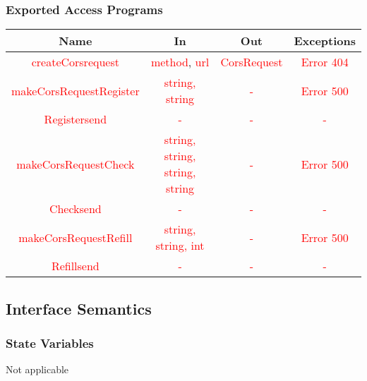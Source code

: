\documentclass[12,english]{article}
\begin{document}
			\subsubsection{Exported Access Programs}
				\begin{tabular}[pos]{|c|c|c|c|}
					
					\hline
					\textbf{Name} & \textbf{In} & \textbf{Out} & \textbf{Exceptions} \\ \hline
					
					\textcolor{red}{createCorsrequest} & \textcolor{red}{method}, \textcolor{red}{url} & \textcolor{red}{CorsRequest} & \textcolor{red}{Error 404} \\ \hline
					\textcolor{red}{makeCorsRequestRegister} & \textcolor{red}{string, string} & \textcolor{red}{-} &  \textcolor{red}{Error 500} \\ \hline
					\textcolor{red}{Registersend} & \textcolor{red}{-} & \textcolor{red}{-} &  \textcolor{red}{-} \\ \hline
					\textcolor{red}{makeCorsRequestCheck} & \textcolor{red}{string, string, string, string} & \textcolor{red}{-} &  \textcolor{red}{Error 500} \\ \hline
					\textcolor{red}{Checksend} & \textcolor{red}{-} & \textcolor{red}{-} &  \textcolor{red}{-} \\ \hline
					\textcolor{red}{makeCorsRequestRefill} & \textcolor{red}{string, string, int} & \textcolor{red}{-} &  \textcolor{red}{Error 500} \\ \hline
					\textcolor{red}{Refillsend} & \textcolor{red}{-} & \textcolor{red}{-} &  \textcolor{red}{-} \\ \hline
					
					
				\end{tabular}
				
		\subsection{Interface Semantics}
			\subsubsection{State Variables}
			Not applicable
			
\end{document}
